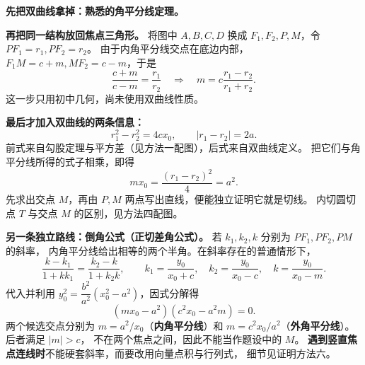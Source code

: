 \clearpage
\begin{explanationbox}
\textbf{先把双曲线拿掉：熟悉的角平分线定理。}


\textbf{再把同一结构放回焦点三角形。}
将图中 $A,B,C,D$ 换成 $F_1,F_2,P,M$，令 $PF_1=r_1,PF_2=r_2$。
由于内角平分线交点在底边内部，$F_1M=c+m,MF_2=c-m$，于是
\[
\frac{c+m}{c-m}=\frac{r_1}{r_2}
\quad\Longrightarrow\quad
\boxed{m=c\frac{r_1-r_2}{r_1+r_2}}.
\]
这一步只用初中几何，尚未使用双曲线性质。

\textbf{最后才加入双曲线的两条信息：}
\[
r_1^2-r_2^2=4cx_0,\qquad |r_1-r_2|=2a.
\]
前式来自勾股定理与平方差（见方法一配图），后式来自双曲线定义。
把它们与角平分线所得的式子相乘，即得
\[
\boxed{mx_0=\frac{(r_1-r_2)^2}{4}=a^2}.
\]
先求出交点 $M$，再由 $P,M$ 两点写出直线，便能独立证明它就是切线。
内切圆切点 $T$ 与交点 $M$ 的区别，见方法四配图。

\medskip
\textbf{另一条独立路线：倒角公式（正切差角公式）。}
若 $k_1,k_2,k$ 分别为 $PF_1,PF_2,PM$ 的斜率，
内角平分线给出相等的两个半角。在斜率存在的普通情形下，
\[
\boxed{\frac{k-k_1}{1+kk_1}=\frac{k_2-k}{1+k_2k}},\qquad
k_1=\frac{y_0}{x_0+c},\quad
k_2=\frac{y_0}{x_0-c},\quad
k=\frac{y_0}{x_0-m}.
\]
代入并利用 $y_0^2=\dfrac{b^2}{a^2}(x_0^2-a^2)$，因式分解得
\[
(mx_0-a^2)(c^2x_0-a^2m)=0.
\]
两个候选交点分别为 $m=a^2/x_0$（\textbf{内角平分线}）和
$m=c^2x_0/a^2$（\textbf{外角平分线}）。后者满足 $|m|>c$，
不在两个焦点之间，因此不能当作题设中的 $M$。
\textbf{遇到竖直焦点连线时}不能硬套斜率，而要改用向量点积与行列式，
细节见证明方法六。
\end{explanationbox}
